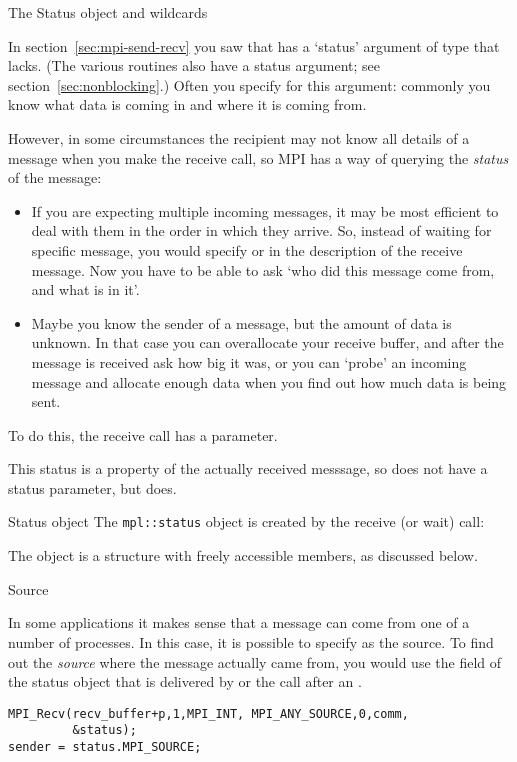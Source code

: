  {The Status object and wildcards}
\label{sec:mpi-wildcard}
\label{sec:mpi-status}

In section~\ref{sec:mpi-send-recv}
you saw that  has a `status' argument
of type  that  lacks.
(The various   routines also have a status
argument; see section~\ref{sec:nonblocking}.)
Often you specify 
for this argument: commonly you know
what data is coming in and where it is coming from.

However, in some circumstances the recipient may not know all details of a
message when you make the receive call, so MPI has a way of querying
the \emph{status} of the message:
\begin{itemize}
\item If you are expecting multiple incoming messages, it may be most
  efficient to deal with them in the order in which they arrive. So,
  instead of waiting for specific message, you would specify
   or  in
  the description of the receive message. 
  Now you have to be able to ask `who did this message come from,
  and what is in it'.
\item Maybe you know the sender of a message, but the amount of data
  is unknown. In that case you can overallocate your receive buffer,
  and after the message is received ask how big it was, or you can
  `probe' an incoming message and allocate enough data when you find
  out how much data is being sent.
\end{itemize}

To do this, the receive call has a 
parameter.

This status is a property of the actually received messsage, so 
does not have a status parameter, but  does.

\begin{mplnote}{Status object}
  The \lstinline+mpl::status+ object is created by the receive
  (or wait) call:
\end{mplnote}

The  object
is a structure with freely accessible members,
as discussed below.

 {Source}

In some applications it makes sense that a message can come from 
one of a number of processes. In this case, it is possible to specify
 as the source.
%
To find out the \emph{source}
where the message actually
came from, you would use the  field of the status object
that is delivered by  or the  call after an .
\begin{lstlisting}
MPI_Recv(recv_buffer+p,1,MPI_INT, MPI_ANY_SOURCE,0,comm,
         &status);
sender = status.MPI_SOURCE;
\end{lstlisting}

